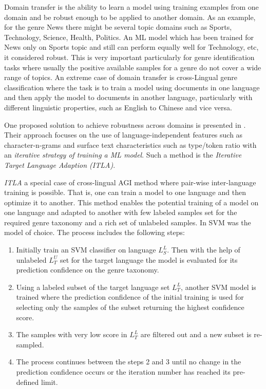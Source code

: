 \begin{itemize}
\begin{end}
Domain transfer is the ability to learn a model using training examples from one domain and be robust enough to be applied to another domain. As an example, for the genre News there might be several topic domains such as Sports, Technology, Science, Health, Politics. An ML model which has been trained for News only on Sports topic and still can perform equally well for Technology, etc, it considered robust. This is very important particularly for genre identification tasks where usually the positive available samples for a genre do not cover a wide range of topics. An extreme case of domain transfer is cross-Lingual genre classification where the task is to train a model using documents in one language and then apply the model to documents in another language, particularly with different linguistic properties, such as English to Chinese and vice versa.

One proposed solution to achieve robustness across domains is presented in \parencite{petrenz2011stable}. Their approach focuses on the use of language-independent features such as character-n-grams and surface text characteristics such as type/token ratio with an \textit{iterative strategy of training a ML model}. Such a method is the \textit{Iterative Target Language Adaption (ITLA)}. 

\textit{ITLA} a special case of cross-lingual AGI method where pair-wise inter-language training is possible. That is, one can train a model to one language and then optimize it to another. This method enables the potential training of a model on one language and adapted to another with few labeled samples set for the required genre taxonomy and a rich set of unlabeled samples. In \parencite{petrenz2011stable} SVM was the model of choice. The process includes the following steps:

\begin{enumerate}
\item Initially train an SVM classifier on language $L^{L}_{S}$. Then with the help of unlabeled $L^{U}_{T}$ set for the target language the model is evaluated for its prediction confidence on the genre taxonomy.
\item Using a labeled subset of the target language set $L^{L}_{T}$, another SVM model is trained where the prediction confidence of the initial training is used for selecting only the samples of the subset returning the highest confidence score. 
\item The samples with very low score in $L^{L}_{T}$ are filtered out and a new subset is re-sampled.
\item The process continues between the steps 2 and 3 until no change in the prediction confidence occurs or the iteration number has reached its pre-defined limit.
\end{enumerate}


\end{end}
\end{itemize}

